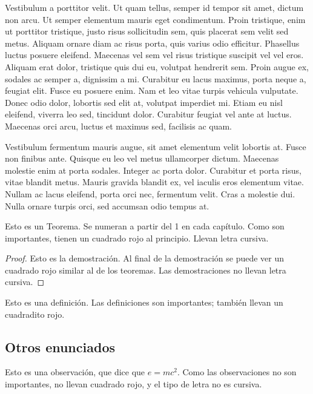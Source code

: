 \documentclass[12pt, twoside]{book}
\begin{document}
Vestibulum a porttitor velit. Ut quam tellus, semper id tempor sit amet, dictum non arcu. Ut semper elementum mauris eget condimentum. Proin tristique, enim ut porttitor tristique, justo risus sollicitudin sem, quis placerat sem velit sed metus. Aliquam ornare diam ac risus porta, quis varius odio efficitur. Phasellus luctus posuere eleifend. Maecenas vel sem vel risus tristique suscipit vel vel eros. Aliquam erat dolor, tristique quis dui eu, volutpat hendrerit sem. Proin augue ex, sodales ac semper a, dignissim a mi. Curabitur eu lacus maximus, porta neque a, feugiat elit. Fusce eu posuere enim. Nam et leo vitae turpis vehicula vulputate. Donec odio dolor, lobortis sed elit at, volutpat imperdiet mi. Etiam eu nisl eleifend, viverra leo sed, tincidunt dolor. Curabitur feugiat vel ante at luctus. Maecenas orci arcu, luctus et maximus sed, facilisis ac quam.

Vestibulum fermentum mauris augue, sit amet elementum velit lobortis at. Fusce non finibus ante. Quisque eu leo vel metus ullamcorper dictum. Maecenas molestie enim at porta sodales. Integer ac porta dolor. Curabitur et porta risus, vitae blandit metus. Mauris gravida blandit ex, vel iaculis eros elementum vitae. Nullam ac lacus eleifend, porta orci nec, fermentum velit. Cras a molestie dui. Nulla ornare turpis orci, sed accumsan odio tempus at.

\begin{theorem}[Euclides]\label{thm:th1}
    Esto es un Teorema. Se numeran a partir del 1 en cada capítulo. Como son importantes, tienen un cuadrado rojo al principio. Llevan letra cursiva.
\end{theorem}

\begin{proof}
    Esto es la demostración. Al final de la demostración se puede ver un cuadrado rojo similar al de los teoremas. Las demostraciones no llevan letra cursiva.
\end{proof}


\begin{definition}\label{def:1}
    Esto es una definición. Las definiciones son importantes; también llevan un cuadradito rojo.
\end{definition}


\subsection{Otros enunciados}


\begin{remark}
    Esto es una observación, que dice que $e=mc^{2}$. Como las observaciones no son importantes, no llevan cuadrado rojo, y el tipo de letra no es cursiva.
\end{remark}
\end{document}
